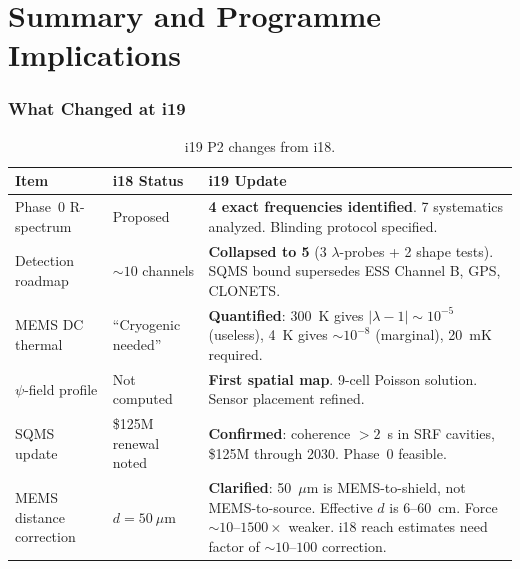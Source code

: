 \documentclass[11pt]{article}
\newcommand{\lbone}{|\lambda - 1|}
\theoremstyle{definition}
\theoremstyle{remark}
\begin{document}
\part{Summary and Programme Implications}
\label{part:summary}


\section{What Changed at i19}

\begin{table}[H]
\centering
\caption{i19 P2 changes from i18.}
\renewcommand{\arraystretch}{1.3}
\begin{tabular}{@{}p{4cm}p{4cm}p{4.5cm}@{}}
\toprule
\textbf{Item} & \textbf{i18 Status} & \textbf{i19 Update} \\
\midrule
\rowcolor{rowok}
Phase~0 R-spectrum & Proposed & \textbf{4 exact frequencies identified}.
  7 systematics analyzed. Blinding protocol specified. \\
\rowcolor{rowok}
Detection roadmap & $\sim 10$ channels & \textbf{Collapsed to 5}
  (3 $\lambda$-probes + 2 shape tests). SQMS bound supersedes
  ESS Channel B, GPS, CLONETS. \\
\rowcolor{rowok}
MEMS DC thermal & ``Cryogenic needed'' & \textbf{Quantified}: 300~K
  gives $\lbone \sim 10^{-5}$ (useless), 4~K gives $\sim 10^{-8}$
  (marginal), 20~mK required. \\
\rowcolor{rowok}
$\psi$-field profile & Not computed & \textbf{First spatial map}.
  9-cell Poisson solution. Sensor placement refined. \\
\rowcolor{rowok}
SQMS update & \$125M renewal noted & \textbf{Confirmed}: coherence
  $>2$~s in SRF cavities, \$125M through 2030. Phase~0 feasible. \\
\rowcolor{rowhi}
MEMS distance correction & $d = 50~\mu$m & \textbf{Clarified}:
  50~$\mu$m is MEMS-to-shield, not MEMS-to-source. Effective $d$
  is 6--60~cm. Force $\sim 10$--$1500\times$ weaker. i18 reach
  estimates need factor of $\sim 10$--$100$ correction. \\
\bottomrule
\end{tabular}
\end{table}
\end{document}
